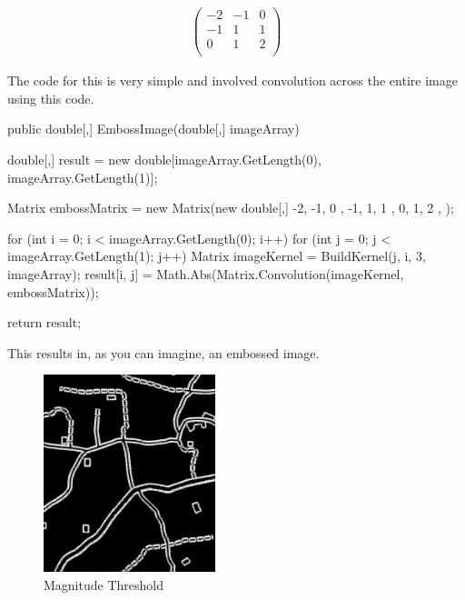 \begin{flushleft}
        \begin{gather*}
            \begin{pmatrix}
                -2 & -1 & 0 \\
                -1 & 1  & 1 \\
                0  & 1  & 2 \\
            \end{pmatrix}
        \end{gather*}

        The code for this is very simple and involved convolution across the entire image using this code. \\ \bk

        \begin{cscode}
public double[,] EmbossImage(double[,] imageArray)
{
    double[,] result = new double[imageArray.GetLength(0), imageArray.GetLength(1)];

    Matrix embossMatrix = new Matrix(new double[,]
    {
        { -2, -1, 0 },
        { -1, 1, 1 },
        { 0, 1, 2 },
    });

    for (int i = 0; i < imageArray.GetLength(0); i++)
    {
        for (int j = 0; j < imageArray.GetLength(1); j++)
        {
            Matrix imageKernel = BuildKernel(j, i, 3, imageArray);
            result[i, j] = Math.Abs(Matrix.Convolution(imageKernel, embossMatrix));
        }
    }

    return result;
}
        \end{cscode}

        This results in, as you can imagine, an embossed image. \\ \bk

        \begin{figure}[H]
            \centering
            \includegraphics[width=5cm]{images/edgeDetectionPrototype/j.jpg}
            \caption{Magnitude Threshold}
            \label{fig:proto_embossedImage}
        \end{figure} \bk


\end{flushleft}
